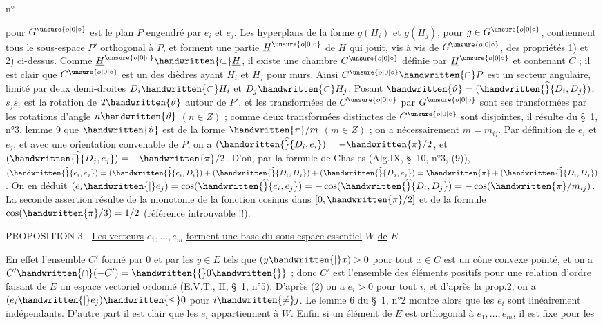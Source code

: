 \begin{flushright}n°\end{flushright}
pour $G^{\unsure{o|0|\circ}}$ est le plan $P$ engendré par $e_i$ et $e_j$. Les hyperplans de la forme $g(H_i)$ et $g(H_j)$, pour $g\in G^{\unsure{o|0|\circ}}$, contiennent tous le sous-espace $P'$ orthogonal à $P$, et forment une partie $\underline{H}^{\unsure{o|0|\circ}}$ de $\underline{H}$ qui jouit, vis à vis de $G^{\unsure{o|0|\circ}}$, des propriétés 1) et 2) ci-dessus. Comme $\underline{H}^{\unsure{o|0|\circ}}\handwritten{\subset}\underline{H}$, il existe une chambre $C^{\unsure{o|0|\circ}}$ définie par $\underline{H}^{\unsure{o|0|\circ}}$ et contenant $C$ ; il est clair que $C^{\unsure{o|0|\circ}}$ est un des dièdres ayant $H_i$ et $H_j$ pour murs. Ainsi $C^{\unsure{o|0|\circ}}\handwritten{\cap}P$ est un secteur angulaire, limité par deux demi-droites $D_i\handwritten{\subset}H_i$ et $D_j\handwritten{\subset}H_j$. Posant $\handwritten{\vartheta}=(\handwritten{\widehat}{D_i,D_j})$, $s_j s_i$ est la rotation de $2\handwritten{\vartheta}$ autour de $P'$, et les transformées de $C^{\unsure{o|0|\circ}}$ par $G^{\unsure{o|0|\circ}}$ sont ses transformées par les rotations d'angle $n\handwritten{\vartheta}$ $(n\in Z)$ ; comme deux transformées distinctes de $C^{\unsure{o|0|\circ}}$ sont disjointes, il résulte du \S\ 1, n°3, lemme 9 que $\handwritten{\vartheta}$ est de la forme $\handwritten{\pi}/m$ $(m\in Z)$ ; on a nécessairement $m=m_{ij}$. Par définition de $e_i$ et $e_j$, et avec une orientation convenable de $P$, on a $(\handwritten{\widehat}{D_i,e_i})=-\handwritten{\pi}/2$, et $(\handwritten{\widehat}{D_j,e_j})=+\handwritten{\pi}/2$. D'où, par la formule de Chasles (Alg.IX, \S\ 10, n°3, (9)), $(\handwritten{\widehat}{e_i,e_j})=(\handwritten{\widehat}{e_i,D_i})+(\handwritten{\widehat}{D_i,D_j})+(\handwritten{\widehat}{D_j,e_j})=\handwritten{\pi}+(\handwritten{\widehat}{D_i,D_j})$. On en déduit $(e_i\handwritten{|}e_j)=\cos(\handwritten{\widehat}{e_i,e_j})=-\cos(\handwritten{\widehat}{D_i,D_j})=-\cos(\handwritten{\pi}/m_{ij})$. La seconde assertion résulte de la monotonie de la fonction cosinus dans $[0,\handwritten{\pi}/2]$ et de la formule $\cos(\handwritten{\pi}/3)=1/2$ (référence introuvable !!).

PROPOSITION 3.- \uline{Les vecteurs} $e_1,\ldots,e_m$ \uline{forment une base du sous-espace essentiel} $W$ \uline{de} $E$.

En effet l'ensemble $C'$ formé par $0$ et par les $y\in E$ tels que $(y\handwritten{|}x)>0$ pour tout $x\in C$ est un cône convexe pointé, et on a $C'\handwritten{\cap}(-C')=\handwritten{\{}0\handwritten{\}}$ ; donc $C'$ est l'ensemble des éléments positifs pour une relation d'ordre faisant de $E$ un espace vectoriel ordonné (E.V.T., II, \S\ 1, n°5). D'après (2) on a $e_i>0$ pour tout $i$, et d'après la prop.2, on a $(e_i\handwritten{|}e_j)\handwritten{\leq}0$ pour $i\handwritten{\ne}j$. Le lemme 6 du \S\ 1, n°2 montre alors que les $e_i$ sont linéairement indépendants. D'autre part il est clair que les $e_i$ appartiennent à $W$. Enfin si un élément de $E$ est orthogonal à $e_1,\ldots,e_m$, il est fixe pour les
